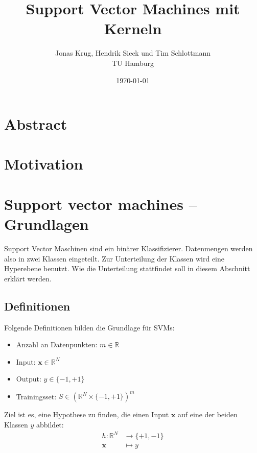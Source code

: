 \documentclass[10pt,a4paper]{scrartcl}
\title{Support Vector Machines mit Kerneln}
\author{Jonas Krug, Hendrik Sieck und Tim Schlottmann \\ TU Hamburg}
\date{\today}
\begin{document}
    \maketitle

    \begin{multicols}{2}

        \section{Abstract}

        \section{Motivation}

        \section{Support vector machines -- Grundlagen}
        Support Vector Maschinen sind ein binärer Klassifizierer. Datenmengen werden also in zwei Klassen eingeteilt. Zur Unterteilung der Klassen wird eine Hyperebene benutzt. Wie die Unterteilung stattfindet soll in diesem Abschnitt erklärt werden.

            \subsection{Definitionen}
                Folgende Definitionen bilden die Grundlage für SVMs:

                \begin{itemize}
                    \item Anzahl an Datenpunkten: $ m \in \mathbb{R} $
                    \item Input: $ \boldsymbol{x} \in \mathbb{R}^N $
                    \item Output: $ y \in \{ -1, +1 \} $
                    \item Trainingsset: $S \in (\mathbb{R}^N \times \{ -1, +1 \})^m $
                \end{itemize}

                Ziel ist es, eine Hypothese zu finden, die einen Input $\boldsymbol{x}$ auf eine der beiden Klassen $y$ abbildet: \begin{align*}
                    h: \mathbb{R}^N &\to \{ +1, -1 \} \\
                    \boldsymbol{x} &\mapsto y
                \end{align*}

\end{multicols}
\end{document}
